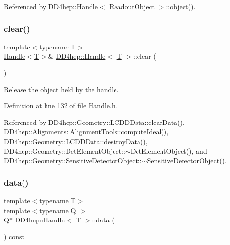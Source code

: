 Referenced by D\+D4hep\+::\+Handle$<$ Readout\+Object $>$\+::object().

\hypertarget{class_d_d4hep_1_1_handle_ad50d0ea67a1c9a4e87d232f96ebe52f1}{}\label{class_d_d4hep_1_1_handle_ad50d0ea67a1c9a4e87d232f96ebe52f1} 
\subsubsection{\texorpdfstring{clear()}{clear()}}
{\footnotesize\ttfamily template$<$typename T$>$ \\
\hyperlink{class_d_d4hep_1_1_handle}{Handle}$<$\hyperlink{class_t}{T}$>$\& \hyperlink{class_d_d4hep_1_1_handle}{D\+D4hep\+::\+Handle}$<$ \hyperlink{class_t}{T} $>$\+::clear (\begin{DoxyParamCaption}{ }\end{DoxyParamCaption})\hspace{0.3cm}{\ttfamily [inline]}}



Release the object held by the handle. 



Definition at line 132 of file Handle.\+h.



Referenced by D\+D4hep\+::\+Geometry\+::\+L\+C\+D\+D\+Data\+::clear\+Data(), D\+D4hep\+::\+Alignments\+::\+Alignment\+Tools\+::compute\+Ideal(), D\+D4hep\+::\+Geometry\+::\+L\+C\+D\+D\+Data\+::destroy\+Data(), D\+D4hep\+::\+Geometry\+::\+Det\+Element\+Object\+::$\sim$\+Det\+Element\+Object(), and D\+D4hep\+::\+Geometry\+::\+Sensitive\+Detector\+Object\+::$\sim$\+Sensitive\+Detector\+Object().

\hypertarget{class_d_d4hep_1_1_handle_accccca2cf7cab5a234ab59b8b9e060a2}{}\label{class_d_d4hep_1_1_handle_accccca2cf7cab5a234ab59b8b9e060a2} 
\subsubsection{\texorpdfstring{data()}{data()}}
{\footnotesize\ttfamily template$<$typename T$>$ \\
template$<$typename Q $>$ \\
Q$\ast$ \hyperlink{class_d_d4hep_1_1_handle}{D\+D4hep\+::\+Handle}$<$ \hyperlink{class_t}{T} $>$\+::data (\begin{DoxyParamCaption}{ }\end{DoxyParamCaption}) const\hspace{0.3cm}{\ttfamily [inline]}}



